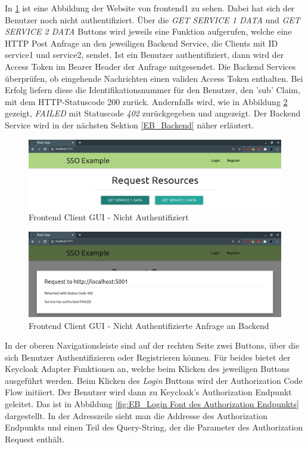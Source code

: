In \ref{fig:EB_Nicht Authentifiziert} ist eine Abbildung der Website von frontend1 zu sehen. Dabei hat sich der Benutzer noch nicht authentifiziert. Über die \textit{GET SERVICE 1 DATA} und \textit{GET SERVICE 2 DATA} Buttons wird jeweils eine Funktion aufgerufen, welche eine HTTP Post Anfrage an den jeweiligen Backend Service, die Clients mit ID service1 und service2, sendet. Ist ein Benutzer authentifiziert, dann wird der Access Token im Bearer Header der Anfrage mitgesendet. Die Backend Services überprüfen, ob eingehende Nachrichten einen validen Access Token enthalten. Bei Erfolg liefern diese die Identifikationsnummer für den Benutzer, den 'sub' Claim, mit dem HTTP-Statuscode 200 zurück. Andernfalls wird, wie in Abbildung \ref{fig:EB_Nicht Authentifizierte Anfrage an Backend} gezeigt, \textit{FAILED} mit Statuscode \textit{402} zurückgegeben und angezeigt. Der Backend Service wird in der nächsten Sektion \ref{EB_Backend} näher erläutert.

\begin{figure}[!ht]
	\centering
	\includegraphics[width=1\textwidth]{Images/Ebert/FrontendLoggedOut.PNG}
	\caption{Frontend Client GUI - Nicht Authentifiziert}
	\label{fig:EB_Nicht Authentifiziert}
\end{figure}

\begin{figure}[!ht]
	\centering
	\includegraphics[width=1\textwidth]{Images/Ebert/FrontendLoggedOutBackendRequest.PNG}
	\caption{Frontend Client GUI - Nicht Authentifizierte Anfrage an Backend}
	\label{fig:EB_Nicht Authentifizierte Anfrage an Backend}
\end{figure}

In der oberen Navigationsleiste sind auf der rechten Seite zwei Buttons, über die sich Benutzer Authentifizieren oder Registrieren können. Für beides bietet der Keycloak Adapter Funktionen an, welche beim Klicken des jeweiligen Buttons ausgeführt werden. Beim Klicken des \textit{Login} Buttons wird der Authorization Code Flow initiiert. Der Benutzer wird dann zu Keycloak's Authorization Endpunkt geleitet. Das ist in Abbildung \ref{fig:EB_Login Font des Authorization Endpunkts} dargestellt. In der Adresszeile sieht man die Addresse des Authorization Endpunkts und einen Teil des Query-String, der die Parameter des Authorization Request enthält.

